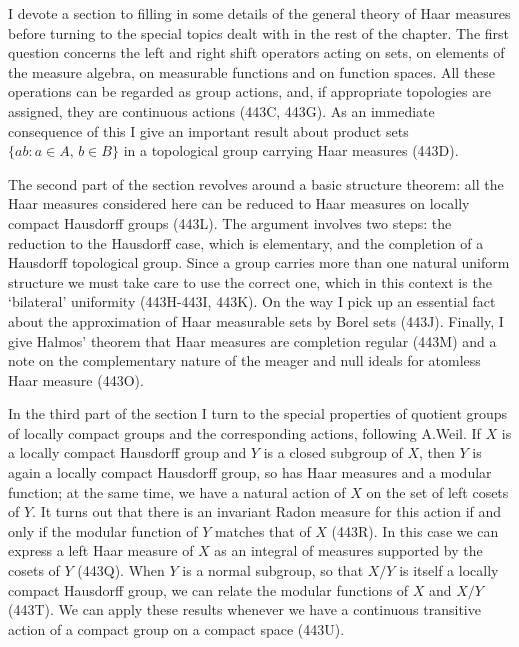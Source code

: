 
\def\lti{left-\vthsp translation-\vthsp invariant}

\def\chaptername{Topological groups}
\def\sectionname{Further properties of Haar measure}


I devote a section to filling in some details of the general theory of
Haar measures before turning to the special topics dealt with in the
rest of the chapter.   The first question concerns the left and right
shift operators acting on sets, on elements of the measure algebra, on
measurable functions and on function spaces.   All these operations can
be regarded as group actions, and, if appropriate topologies are
assigned, they
are continuous actions (443C, 443G).   As an immediate consequence
of this I give an important result about product sets
$\{ab:a\in A,\,b\in B\}$ in a
topological group carrying Haar measures (443D).

The second part of the section revolves around a basic structure
theorem:  all the Haar measures considered here can be reduced to Haar
measures on locally compact Hausdorff groups (443L).   The argument
involves two steps:  the reduction to the Hausdorff case, which is
elementary, and the completion of a Hausdorff topological group.   Since
a group carries more than one natural uniform structure we must take
care to use the correct one, which in this context is the `bilateral'
uniformity (443H-443I, 443K).   On the way I pick up an essential fact
about the approximation of Haar measurable sets by Borel sets (443J).
Finally, I give Halmos' theorem that Haar measures are completion
regular (443M) and a note on the complementary nature of the meager and
null ideals for atomless Haar measure (443O).

In the third part of the section I turn to the special properties of
quotient groups of locally compact groups and the corresponding actions,
following A.Weil.   If $X$ is a locally compact Hausdorff group and $Y$
is a closed subgroup of $X$, then $Y$ is again a locally compact
Hausdorff group, so has Haar measures and a modular function;  at the
same time, we have a natural action of $X$ on the set of left cosets of
$Y$.   It turns out that there is an invariant Radon measure for this
action if and only if the modular function of $Y$ matches that of $X$
(443R).   In this case we can express a left Haar measure of $X$ as an
integral of measures supported by the cosets of $Y$ (443Q).   When $Y$
is a normal subgroup, so that $X/Y$ is itself a locally compact
Hausdorff group, we can relate the modular functions of $X$ and $X/Y$
(443T).   We can apply these results whenever we
have a continuous transitive action of a compact group on a compact
space (443U).


